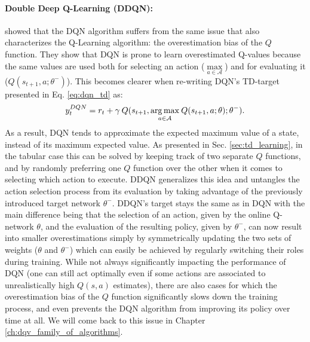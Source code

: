\paragraph{Double Deep Q-Learning (DDQN):} \citet{van2016deep} showed that the DQN algorithm suffers from the same issue that also characterizes the Q-Learning algorithm: the overestimation bias of the $Q$ function. They show that DQN is prone to learn overestimated Q-values because the same values are used both for selecting an action ($\underset{a\in \mathcal{A}}{\max}$) and for evaluating it ($Q(s_{t+1},a;\theta^{-})$). This becomes clearer when re-writing DQN's TD-target presented in Eq. \ref{eq:dqn_td} as:
\begin{equation}
    y^{DQN}_{t} = r_{t} + \gamma \: Q(s_{t+1}, \underset{a\in \mathcal{A}}{\operatorname*{arg\,max}}\: Q(s_{t+1}, a; \theta); \theta^{-}). 
\end{equation}{}
As a result, DQN tends to approximate the expected maximum value of a state, instead of its maximum expected value. As presented in Sec. \ref{sec:td_learning}, in the tabular case this can be solved by keeping track of two separate $Q$ functions, and by randomly preferring one $Q$ function over the other when it comes to selecting which action to execute. DDQN generalizes this idea and untangles the action selection process from its evaluation by taking advantage of the previously introduced target network $\theta^{-}$. DDQN's target stays the same as in DQN with the main difference being that the selection of an action, given by the online Q-network $\theta$, and the evaluation of the resulting policy, given by $\theta^{-}$, can now result into smaller overestimations simply by symmetrically updating the two sets of weights ($\theta$ and $\theta^{-}$) which can easily be achieved by regularly switching their roles during training. While not always significantly impacting the performance of DQN (one can still act optimally even if some actions are associated to unrealistically high $Q(s,a)$ estimates), there are also cases for which the overestimation bias of the $Q$ function significantly slows down the training process, and even prevents the DQN algorithm from improving its policy over time at all. We will come back to this issue in Chapter \ref{ch:dqv_family_of_algorithms}. 


